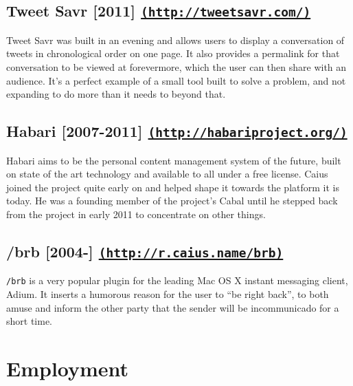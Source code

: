 \documentclass[letterpaper]{article}
\begin{document}

\subsection*{Tweet Savr [2011] \href{http://tweetsavr.com/}{\tt (http://tweetsavr.com/)}} %
\label{sub:tweet_savr}

Tweet Savr was built in an evening and allows users to display a conversation of tweets in chronological order on one page. It also provides a permalink for that conversation to be viewed at forevermore, which the user can then share with an audience. It's a perfect example of a small tool built to solve a problem, and not expanding to do more than it needs to beyond that.


\subsection*{Habari [2007-2011] \href{http://habariproject.org/}{\tt (http://habariproject.org/)}} %
\label{sub:habari}

Habari aims to be the personal content management system of the future, built on state of the art technology and available to all under a free license. Caius joined the project quite early on and helped shape it towards the platform it is today. He was a founding member of the project's Cabal until he stepped back from the project in early 2011 to concentrate on other things.


\subsection*{/brb [2004-\the\year] \href{http://r.caius.name/brb}{\tt (http://r.caius.name/brb)}} %
\label{sub:brb}

{\tt /brb} is a very popular plugin for the leading Mac OS X instant messaging client, Adium. It inserts a humorous reason for the user to ``be right back'', to both amuse and inform the other party that the sender will be incommunicado for a short time.


\section*{Employment}
\end{document}
